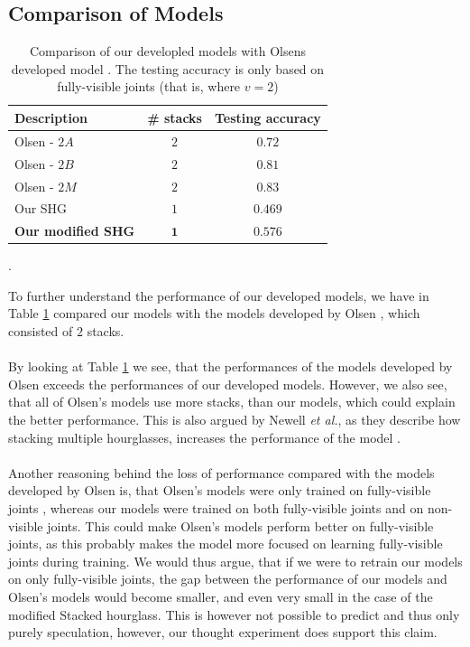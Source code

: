 \documentclass[./main.tex]{subfiles}
\begin{document}
\subsection{Comparison of Models}\label{subsec:comparisons}
\begin{table}[htbp]
    \begin{tabular}{l|c|c}
        Description & \# stacks & Testing accuracy \\
        \hline
        Olsen - $2A$ & $2$ & $0.72$ \\
        \hline
        Olsen - $2B$ & $2$ & $0.81$ \\
        \hline
        Olsen - $2M$ & $2$ & $0.83$ \\
        \hline
        \hline
        Our SHG & $1$ & $0.469$ \\
        \hline
        \textbf{Our modified SHG} & $\bm{1}$ & $\bm{0.576}$ \\
        \hline
    \end{tabular}
    \caption{Comparison of our developled models with Olsens developed model \cite{Camilla}. The testing accuracy is only based on fully-visible joints (that is, where $v = 2$)}.
    \label{fig:Olsen_comparison}
\end{table}
\noindent To further understand the performance of our developed models, we have in Table \ref{fig:Olsen_comparison} compared our models with the models developed by Olsen \cite{Camilla}, which consisted of $2$ stacks.
\\
\\
By looking at Table \ref{fig:Olsen_comparison} we see, that the performances of the models developed by Olsen \cite{Camilla} exceeds the performances of our developed models. However, we also see, that all of Olsen's \cite{Camilla} models use more stacks, than our models, which could explain the better performance. This is also argued by Newell \textit{et al.}, as they describe how stacking multiple hourglasses, increases the performance of the model \cite{Newell}.
\\
\\
Another reasoning behind the loss of performance compared with the models developed by Olsen \cite{Camilla} is, that Olsen's models were only trained on fully-visible joints \cite{Camilla}, whereas our models were trained on both fully-visible joints and on non-visible joints. This could make Olsen's models \cite{Camilla} perform better on fully-visible joints, as this probably makes the model more focused on learning fully-visible joints during training. We would thus argue, that if we were to retrain our models on only fully-visible joints, the gap between the performance of our models and Olsen's models \cite{Camilla} would become smaller, and even very small in the case of the modified Stacked hourglass. This is however not possible to predict and thus only purely speculation, however, our thought experiment does support this claim.
\end{document}
